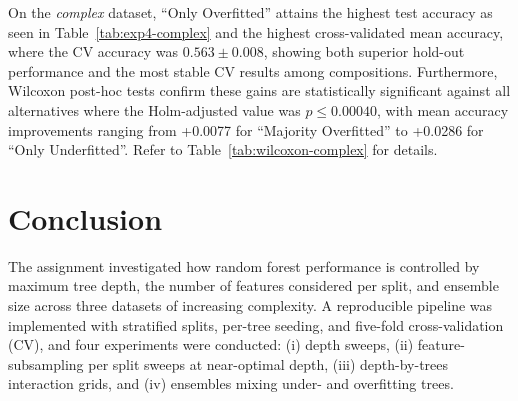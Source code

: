 \documentclass[conference]{IEEEtran}
\begin{document}
On the \textit{complex} dataset, ``Only Overfitted'' attains the highest test accuracy as seen in Table~\ref{tab:exp4-complex} and the highest cross-validated mean accuracy, where the CV accuracy was $0.563 \pm 0.008$, showing both superior hold-out performance and the most stable CV results among compositions.  Furthermore, Wilcoxon post-hoc tests confirm these gains are statistically significant against all alternatives where the Holm-adjusted value was $p \le 0.00040$, with mean accuracy improvements ranging from +0.0077 for  ``Majority Overfitted'' to +0.0286 for ``Only Underfitted''. Refer to Table~\ref{tab:wilcoxon-complex} for details.\\ 


\begin{table}[H]
\centering
\caption{Post-hoc Wilcoxon versus ``Only Overfitted'' - \textit{complex}. One-sided alternative; Holm-adjusted p-values.}
\label{tab:wilcoxon-complex}
\end{table}

\section{Conclusion}

The assignment investigated how random forest performance is controlled by maximum tree depth, the number of features considered per split, and ensemble size across three datasets of increasing complexity. A reproducible pipeline was implemented with stratified splits, per-tree seeding, and five-fold cross-validation (CV), and four experiments were conducted: (i) depth sweeps, (ii) feature-subsampling per split sweeps at near-optimal depth, (iii) depth-by-trees interaction grids, and (iv) ensembles mixing under- and overfitting trees.
\end{document}
